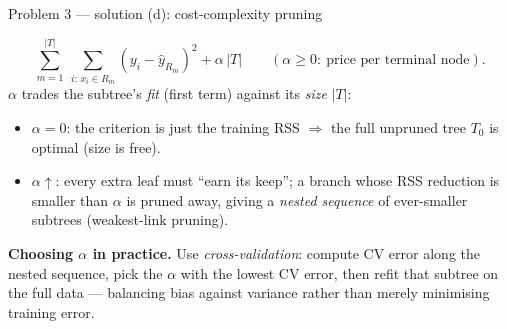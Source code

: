 \documentclass[aspectratio=169,11pt]{beamer}
\begin{document}
\begin{frame}{Problem 3 --- solution (d): cost-complexity pruning}
  \begin{solutionbox}
    \[
      \sum_{m=1}^{|T|}\ \sum_{i:\,x_i\in R_m}(y_i-\hat y_{R_m})^2+\alpha\,|T|
      \qquad(\alpha\ge 0:\ \text{price per terminal node}).
    \]
    $\alpha$ trades the subtree's \emph{fit} (first term) against its \emph{size} $|T|$:
    \begin{itemize}
      \item $\alpha=0$: the criterion is just the training RSS $\Rightarrow$ the full unpruned tree
        $T_0$ is optimal (size is free).
      \item $\alpha\uparrow$: every extra leaf must ``earn its keep''; a branch whose RSS reduction
        is smaller than $\alpha$ is pruned away, giving a \emph{nested sequence} of ever-smaller
        subtrees (weakest-link pruning).
    \end{itemize}
    \textbf{Choosing $\alpha$ in practice.} Use \emph{cross-validation}: compute CV error along the
    nested sequence, pick the $\alpha$ with the lowest CV error, then refit that subtree on the full
    data --- balancing bias against variance rather than merely minimising training error.
  \end{solutionbox}
\end{frame}
\end{document}
